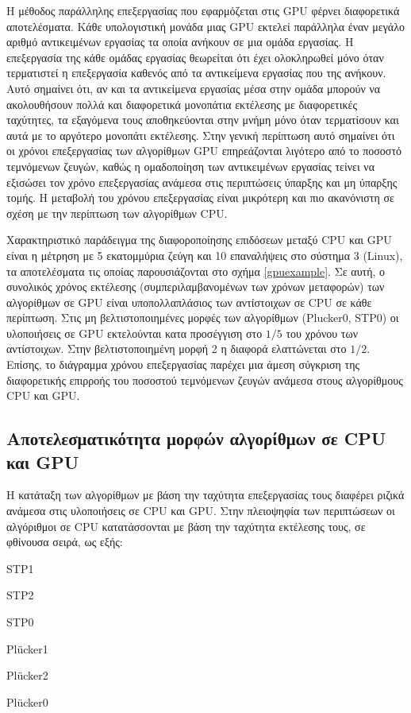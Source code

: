Η μέθοδος παράλληλης επεξεργασίας που εφαρμόζεται στις GPU φέρνει διαφορετικά αποτελέσματα. Κάθε υπολογιστική μονάδα μιας GPU εκτελεί παράλληλα έναν μεγάλο αριθμό αντικειμένων εργασίας τα οποία ανήκουν σε μια ομάδα εργασίας. Η επεξεργασία της κάθε ομάδας εργασίας θεωρείται ότι έχει ολοκληρωθεί μόνο όταν τερματιστεί η επεξεργασία καθενός από τα αντικείμενα εργασίας που της ανήκουν. Αυτό σημαίνει ότι, αν και τα αντικείμενα εργασίας μέσα στην ομάδα μπορούν να ακολουθήσουν πολλά και διαφορετικά μονοπάτια εκτέλεσης με διαφορετικές ταχύτητες, τα εξαγόμενα τους αποθηκεύονται στην μνήμη μόνο όταν τερματίσουν και αυτά με το αργότερο μονοπάτι εκτέλεσης. Στην γενική περίπτωση αυτό σημαίνει ότι οι χρόνοι επεξεργασίας των αλγορίθμων GPU επηρεάζονται λιγότερο από το ποσοστό τεμνόμενων ζευγών, καθώς η ομαδοποίηση των αντικειμένων εργασίας τείνει να εξισώσει τον χρόνο επεξεργασίας ανάμεσα στις περιπτώσεις ύπαρξης και μη ύπαρξης τομής. Η μεταβολή του χρόνου επεξεργασίας είναι μικρότερη και πιο ακανόνιστη σε σχέση με την 
περίπτωση των αλγορίθμων CPU.

Χαρακτηριστικό παράδειγμα της διαφοροποίησης επιδόσεων μεταξύ CPU και GPU είναι η μέτρηση με 5 εκατομμύρια ζεύγη και 10 επαναλήψεις στο σύστημα 3 (Linux), τα αποτελέσματα τις οποίας παρουσιάζονται στο σχήμα \ref{gpuexample}. Σε αυτή, ο συνολικός χρόνος εκτέλεσης (συμπεριλαμβανομένων των χρόνων μεταφορών) των αλγορίθμων σε GPU είναι υποπολλαπλάσιος των αντίστοιχων σε CPU σε κάθε περίπτωση. Στις μη βελτιστοποιημένες μορφές των αλγορίθμων (Plucker0, STP0) οι υλοποιήσεις σε GPU εκτελούνται κατα προσέγγιση στο $1/5$ του χρόνου των αντίστοιχων. Στην βελτιστοποιημένη μορφή 2 η διαφορά ελαττώνεται στο $1/2$. Επίσης, το διάγραμμα χρόνου επεξεργασίας παρέχει μια άμεση σύγκριση της διαφορετικής επιρροής του ποσοστού τεμνόμενων ζευγών ανάμεσα στους αλγορίθμους CPU και GPU.



\subsection{Αποτελεσματικότητα μορφών αλγορίθμων σε CPU και GPU}
\label{chapter:bench_algs}
\noindent Η κατάταξη των αλγορίθμων με βάση την ταχύτητα επεξεργασίας τους διαφέρει ριζικά ανάμεσα στις υλοποιήσεις σε CPU και GPU. Στην πλειοψηφία των περιπτώσεων οι αλγόριθμοι σε CPU κατατάσσονται με βάση την ταχύτητα εκτέλεσης τους, σε φθίνουσα σειρά, ως εξής:

\begin{enumerate*}
\item STP1
\item STP2
\item STP0
\item Plücker1
\item Plücker2
\item Plücker0
\end{enumerate*}

